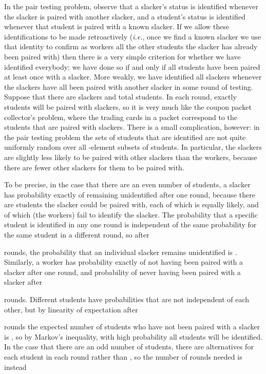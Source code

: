 \documentclass[11pt]{llncs}
\begin{document}
In the pair testing problem, observe that a
slacker's status is identified whenever the slacker is paired with another
slacker, and a student's status is identified whenever that student is
paired with a known slacker. If we allow these identifications to be made
retroactively ({\em i.e.}, once we find a known slacker we use that identity to
confirm as workers all the other students the slacker has already been
paired with) then there is a very simple criterion for whether
we have identified everybody: we have done so if and only if all students have been
paired at least once with a slacker. More weakly, we have identified all
slackers whenever the slackers have all been paired with another slacker in
some round of testing. Suppose that there are  slackers and  total
students. In each round, exactly  students will be paired with slackers, so
it is very much like the coupon packet collector's problem, where the
trading cards in a packet correspond to the students that are paired with
slackers. There is a small complication, however: in the pair testing
problem the sets of students that are identified are not quite uniformly
random over all -element subsets of students. In particular, the slackers
are slightly less likely to be paired with other slackers than the workers, because there
are fewer other slackers for them to be paired with.

To be precise, in the case that there are an even number of students,
 a slacker has probability exactly  of remaining
unidentified after one round, because there are  students the slacker could be paired with, each of which is equally likely, and  of which (the workers) fail to identify the slacker.
The probability that a specific student is identified in any one round is independent of the same probability for the same student in a different round, 
so after

rounds, the probability that an individual slacker remains unidentified is 
. 
Similarly, a worker has probability exactly  of not having been paired with a slacker after one round, and probability 
 of never having been paired with a slacker after

rounds.
Different students have probabilities that are not independent of each other, 
but by linearity of expectation
after

rounds the expected number of students who have not been paired with 
a slacker is , 
so by Markov's inequality, 
with high probability all students will be identified. 
In the case that there are an odd number of students, 
there are  alternatives for each student in each round rather than , 
so the number of rounds needed is instead
\end{document}
